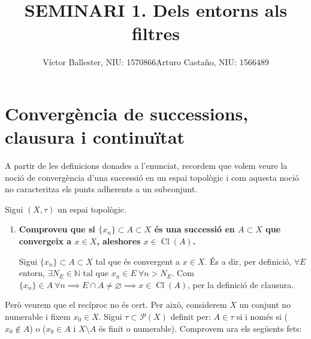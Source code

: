 \documentclass[10pt,a4paper]{article}
\title{\bfseries\large SEMINARI 1. Dels entorns als filtres}
\author{Víctor Ballester, NIU: 1570866\endgraf Arturo Castaño, NIU: 1566489}
\date{\parbox{\linewidth}{\centering
  Topologia\endgraf
  Grau en Matemàtiques\endgraf
  Universitat Autònoma de Barcelona\endgraf
  Octubre de 2021}}
\DeclareMathOperator{\Cl}{Cl} %
\begin{document}
\maketitle
\section{Convergència de successions, clausura i continuïtat}
A partir de les definicions donades a l'enunciat, recordem que volem veure la noció de convergència d'una successió en un espai topològic i com aquesta noció no caracteritza els punts adherents a un subconjunt.

Sigui $(X,\tau)$ un espai topològic.
\begin{enumerate}
      \item \textbf{Comproveu que si $\{x_n\}\subset A\subset X$ és una successió en $A\subset X$ que convergeix a $x\in X$, aleshores $x\in\Cl(A)$.}

            Sigui $\{x_n\}\subset A \subset X$ tal que és convergent a $x \in X$. És a dir, per definició, $\forall E$ entorn, $\exists N_E \in \mathbb N$ tal que $x_n \in E\ \forall n >N_E$. Com $\{x_n\}\in A \ \forall n\implies E\cap A \neq \varnothing \implies x\in\Cl(A)$, per la definició de clausura.
\end{enumerate}
Però veurem que el recíproc no és cert. Per això, considerem $X$ un conjunt no numerable i fixem $x_0 \in X$. Sigui $\tau \subset \mathcal{P}(X)$ definit per: $A \in \tau$ si i només si ($x_0 \notin A$) o ($x_0 \in A$ i $X \setminus A$ és finit o numerable). Comprovem ara els següents fets:
\end{document}
